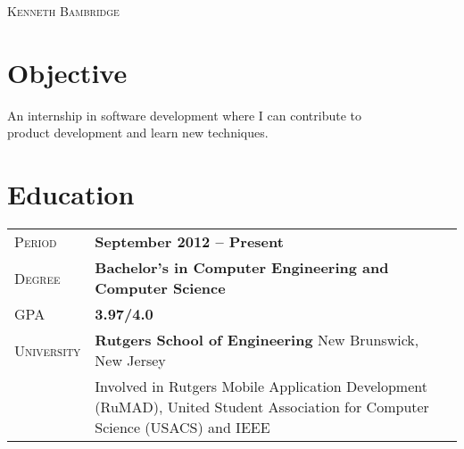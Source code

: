 \documentclass[a4paper, oneside, final]{scrartcl} %
\newcommand{\gray}{\rowcolor[gray]{.90}} %
\begin{document}
\begin{center} %


{\fontsize{30}{30}\selectfont\scshape Kenneth Bambridge} %

\vspace{0.8cm} %


\section{Objective}

An internship in software development where I can contribute to \\ product development and learn new techniques.


\section{Education}

\begin{tabularx}{0.97\linewidth}{>{\raggedleft\scshape}p{2cm}X}
\gray Period & \textbf{September 2012 -- Present}\\
\gray Degree & \textbf{Bachelor's in Computer Engineering and Computer Science}\\
\gray GPA & \textbf{3.97/4.0}\\
\gray University & \textbf{Rutgers School of Engineering} \hfill New Brunswick, New Jersey\\
 & Involved in Rutgers Mobile Application Development (RuMAD), United Student Association for
Computer Science (USACS) and IEEE
\end{tabularx}

\vspace{10pt}


\end{center}
\end{document}
